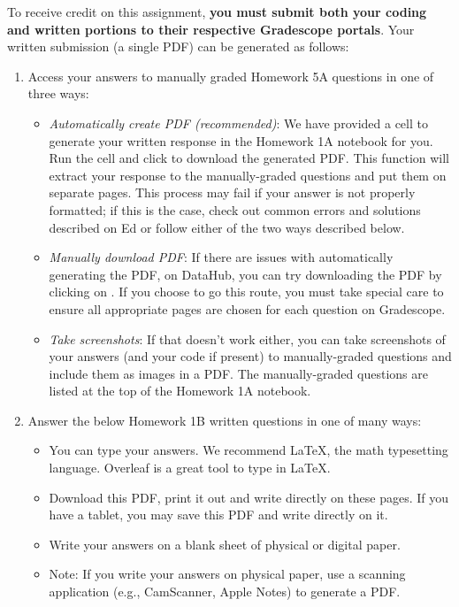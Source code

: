 \documentclass[addpoints, 12pt]{exam}
\theoremstyle{definition}
\begin{document}
\noindent  To receive credit on this assignment, \textbf{you must submit both your coding and written portions to their respective Gradescope portals}. Your written submission (a single PDF) can be generated as follows:
\begin{enumerate}
    \item Access your answers to manually graded Homework 5A  questions in one of three ways:
    \begin{itemize}
        \item \textit{Automatically create PDF (recommended)}: We have provided a cell to generate your written response in the Homework 1A notebook for you. Run the cell and click to download the generated PDF. This function will extract your response to the manually-graded questions and put them on separate pages. This process may fail if your answer is not properly formatted; if this is the case, check out common errors and solutions described on Ed or follow either of the two ways described below.
        \item \textit{Manually download PDF}: If there are issues with automatically generating the PDF, on DataHub, you can try downloading the PDF by clicking on . If you choose to go this route, you must take special care to ensure all appropriate pages are chosen for each question on Gradescope.
        \item \textit{Take screenshots}: If that doesn't work either, you can take screenshots of your answers (and your code if present) to manually-graded questions and include them as images in a PDF. The manually-graded questions are listed at the top of the Homework 1A notebook.
    \end{itemize}
    
    \item Answer the below Homework 1B written questions in one of many ways:
    \begin{itemize}
        \item You can type your answers. We recommend LaTeX, the math typesetting language. Overleaf is a great tool to type in LaTeX.
        \item Download this PDF, print it out and write directly on these pages. If you have a tablet, you may save this PDF and write directly on it.
        \item Write your answers on a blank sheet of physical or digital paper.
        \item Note: If you write your answers on physical paper, use a scanning application (e.g., CamScanner, Apple Notes) to generate a PDF.
    \end{itemize}
    

\end{enumerate}
\end{document}
